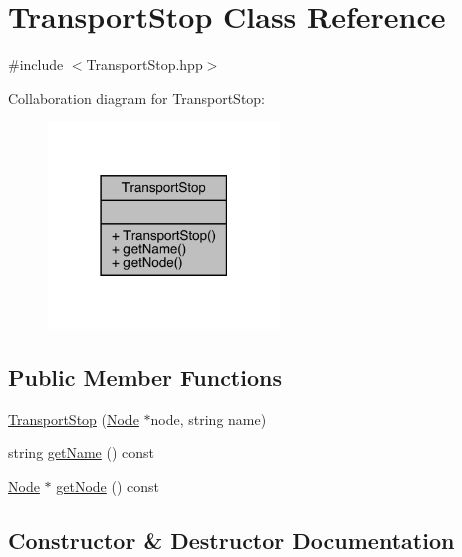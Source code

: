 \hypertarget{class_transport_stop}{}\section{Transport\+Stop Class Reference}
\label{class_transport_stop}


{\ttfamily \#include $<$Transport\+Stop.\+hpp$>$}



Collaboration diagram for Transport\+Stop\+:\nopagebreak
\begin{figure}[H]
\begin{center}
\leavevmode
\includegraphics[width=174pt]{class_transport_stop__coll__graph}
\end{center}
\end{figure}
\subsection*{Public Member Functions}
\begin{DoxyCompactItemize}
\item 
\hyperlink{class_transport_stop_ab41c7393ddb45b59cc172724eff2ff77}{Transport\+Stop} (\hyperlink{class_node}{Node} $\ast$node, string name)
\item 
string \hyperlink{class_transport_stop_ac4e1999cbad5b9d6e25c9abee0649064}{get\+Name} () const
\item 
\hyperlink{class_node}{Node} $\ast$ \hyperlink{class_transport_stop_ab38b14d8cfac1949ac8f853fdf8620bc}{get\+Node} () const
\end{DoxyCompactItemize}


\subsection{Constructor \& Destructor Documentation}
\hypertarget{class_transport_stop_ab41c7393ddb45b59cc172724eff2ff77}{}\label{class_transport_stop_ab41c7393ddb45b59cc172724eff2ff77} 
